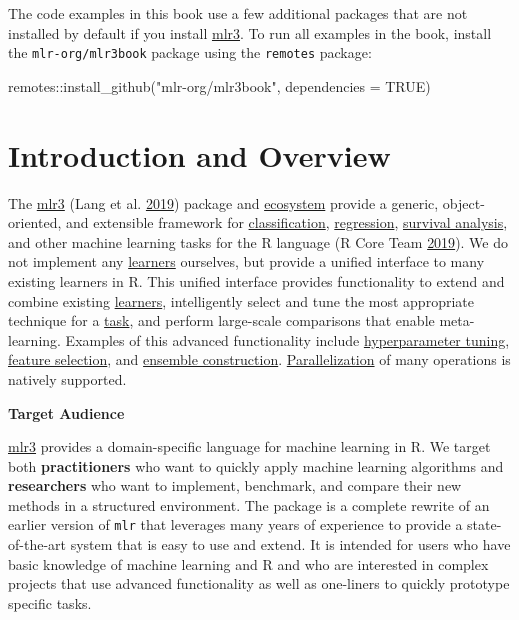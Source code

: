\documentclass[
  11pt,
  parskip=half,
  DIV=calc,
  BCOR=10mm,
  x11names]{scrbook}
\newenvironment{Shaded}{}{}
\newcommand{\DataTypeTok}[1]{#1}
\newcommand{\KeywordTok}[1]{\textcolor[rgb]{0.00,0.00,1.00}{#1}}
\newcommand{\NormalTok}[1]{#1}
\newcommand{\OperatorTok}[1]{#1}
\newcommand{\OtherTok}[1]{\textcolor[rgb]{1.00,0.25,0.00}{#1}}
\newcommand{\StringTok}[1]{\textcolor[rgb]{0.00,0.50,0.50}{#1}}
\begin{document}
The code examples in this book use a few additional packages that are not installed by default if you install \href{https://mlr3.mlr-org.com}{mlr3}.
To run all examples in the book, install the \texttt{mlr-org/mlr3book} package using the \texttt{remotes} package:

\begin{Shaded}
\begin{Highlighting}[]
\NormalTok{remotes}\OperatorTok{::}\KeywordTok{install_github}\NormalTok{(}\StringTok{"mlr-org/mlr3book"}\NormalTok{, }\DataTypeTok{dependencies =} \OtherTok{TRUE}\NormalTok{)}
\end{Highlighting}
\end{Shaded}

\hypertarget{introduction-and-overview}{%
\chapter{Introduction and Overview}\label{introduction-and-overview}}

The \href{https://mlr3.mlr-org.com}{mlr3} (Lang et al. \protect\hyperlink{ref-mlr3}{2019}) package and \href{https://github.com/mlr-org/mlr3/wiki/Extension-Packages}{ecosystem} provide a generic, object-oriented, and extensible framework for \protect\hyperlink{tasks}{classification}, \protect\hyperlink{tasks}{regression}, \protect\hyperlink{survival}{survival analysis}, and other machine learning tasks for the R language (R Core Team \protect\hyperlink{ref-R}{2019}).
We do not implement any \protect\hyperlink{learners}{learners} ourselves, but provide a unified interface to many existing learners in R.
This unified interface provides functionality to extend and combine existing \protect\hyperlink{learners}{learners}, intelligently select and tune the most appropriate technique for a \protect\hyperlink{tasks}{task}, and perform large-scale comparisons that enable meta-learning.
Examples of this advanced functionality include \protect\hyperlink{tuning}{hyperparameter tuning}, \protect\hyperlink{fs}{feature selection}, and \protect\hyperlink{fs-ensemble}{ensemble construction}. \protect\hyperlink{parallelization}{Parallelization} of many operations is natively supported.

\textbf{Target Audience}

\href{https://mlr3.mlr-org.com}{mlr3} provides a domain-specific language for machine learning in R.
We target both \textbf{practitioners} who want to quickly apply machine learning algorithms and \textbf{researchers} who want to implement, benchmark, and compare their new methods in a structured environment.
The package is a complete rewrite of an earlier version of \texttt{mlr} that leverages many years of experience to provide a state-of-the-art system that is easy to use and extend.
It is intended for users who have basic knowledge of machine learning and R and who are interested in complex projects that use advanced functionality as well as one-liners to quickly prototype specific tasks.
\end{document}
